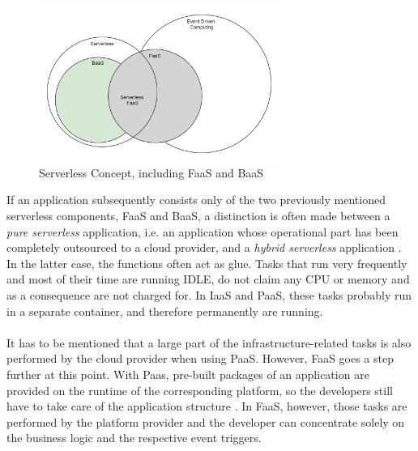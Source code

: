 \documentclass[11pt]{article}
\begin{document}
\begin{figure}[H]
\caption{Serverless Concept, including FaaS and BaaS}
\label{fig:serverlessBaaSandPaas}
\centering
\includegraphics[width=0.7\textwidth]{Serverless}
\end{figure} 
If an application subsequently consists only of the two previously mentioned serverless components, FaaS and BaaS, a distinction is often made between a \textit{pure serverless} application, i.e. an application whose operational part has been completely outsourced to a cloud provider, and a \textit{hybrid serverless} application \cite{leitner2019mixed}. In the latter case, the functions often act as glue. Tasks that run very frequently and most of their time are running IDLE, do not claim any CPU or memory and as a consequence are not charged for. In IaaS and PaaS, these tasks probably run in a separate container, and therefore permanently are running. \\\\  
It has to be mentioned that a large part of the infrastructure-related tasks is also performed by the cloud provider when using PaaS. However, FaaS goes a step further at this point. With Paas, pre-built packages of an application are provided on the runtime of the corresponding platform, so the developers still have to take care of the application structure \cite{kaplan2019framework}. In FaaS, however, those tasks are performed by the platform provider and the developer can concentrate solely on the business logic and the respective event triggers. \\\\
\end{document}
